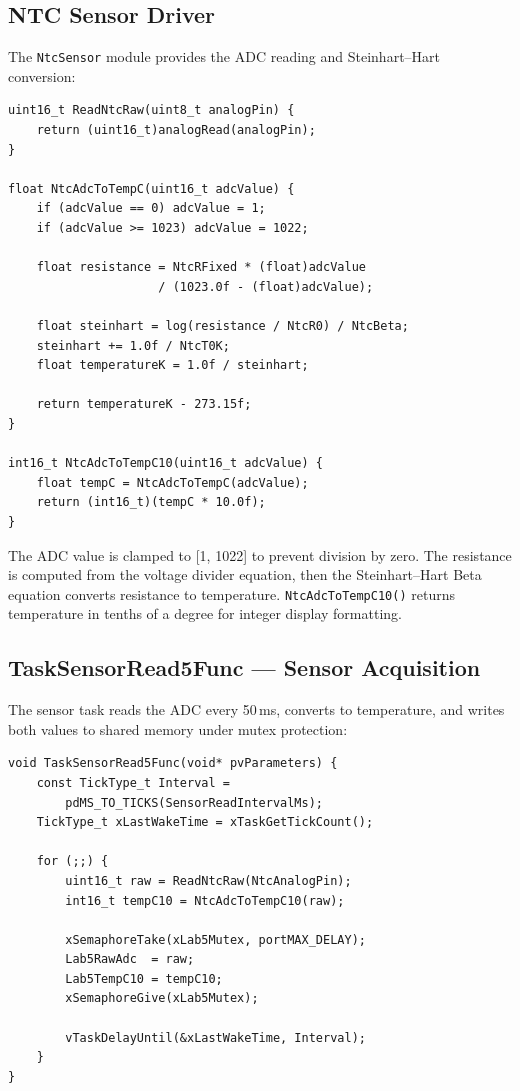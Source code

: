 \documentclass[12pt]{article}
\begin{document}
\subsection{NTC Sensor Driver}

The \texttt{NtcSensor} module provides the ADC reading and Steinhart--Hart conversion:

\begin{lstlisting}[caption={NtcSensor --- ADC read and temperature conversion}]
uint16_t ReadNtcRaw(uint8_t analogPin) {
    return (uint16_t)analogRead(analogPin);
}

float NtcAdcToTempC(uint16_t adcValue) {
    if (adcValue == 0) adcValue = 1;
    if (adcValue >= 1023) adcValue = 1022;

    float resistance = NtcRFixed * (float)adcValue
                     / (1023.0f - (float)adcValue);

    float steinhart = log(resistance / NtcR0) / NtcBeta;
    steinhart += 1.0f / NtcT0K;
    float temperatureK = 1.0f / steinhart;

    return temperatureK - 273.15f;
}

int16_t NtcAdcToTempC10(uint16_t adcValue) {
    float tempC = NtcAdcToTempC(adcValue);
    return (int16_t)(tempC * 10.0f);
}
\end{lstlisting}

The ADC value is clamped to [1, 1022] to prevent division by zero. The resistance is computed from the voltage divider equation, then the Steinhart--Hart Beta equation converts resistance to temperature. \texttt{NtcAdcToTempC10()} returns temperature in tenths of a degree for integer display formatting.

\subsection{TaskSensorRead5Func --- Sensor Acquisition}

The sensor task reads the ADC every 50\,ms, converts to temperature, and writes both values to shared memory under mutex protection:

\begin{lstlisting}[caption={TaskSensorRead5Func --- periodic sensor acquisition}]
void TaskSensorRead5Func(void* pvParameters) {
    const TickType_t Interval =
        pdMS_TO_TICKS(SensorReadIntervalMs);
    TickType_t xLastWakeTime = xTaskGetTickCount();

    for (;;) {
        uint16_t raw = ReadNtcRaw(NtcAnalogPin);
        int16_t tempC10 = NtcAdcToTempC10(raw);

        xSemaphoreTake(xLab5Mutex, portMAX_DELAY);
        Lab5RawAdc  = raw;
        Lab5TempC10 = tempC10;
        xSemaphoreGive(xLab5Mutex);

        vTaskDelayUntil(&xLastWakeTime, Interval);
    }
}
\end{lstlisting}
\end{document}
